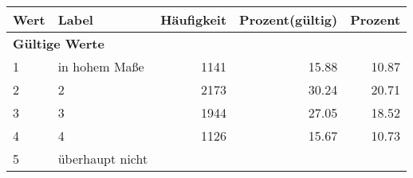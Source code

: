      \begin{longtable}{lXrrr}
     \toprule
     \textbf{Wert} & \textbf{Label} & \textbf{Häufigkeit} & \textbf{Prozent(gültig)} & \textbf{Prozent} \\
     \endhead
     \midrule
     \multicolumn{5}{l}{\textbf{Gültige Werte}}\\

     1 &
     \multicolumn{1}{X}{ in hohem Maße   } &


       \num{1141} &
       \num[round-mode=places,round-precision=2]{15.88} &
         \num[round-mode=places,round-precision=2]{10.87} \\

     2 &
     \multicolumn{1}{X}{ 2   } &


       \num{2173} &
       \num[round-mode=places,round-precision=2]{30.24} &
         \num[round-mode=places,round-precision=2]{20.71} \\

     3 &
     \multicolumn{1}{X}{ 3   } &


       \num{1944} &
       \num[round-mode=places,round-precision=2]{27.05} &
         \num[round-mode=places,round-precision=2]{18.52} \\

     4 &
     \multicolumn{1}{X}{ 4   } &


       \num{1126} &
       \num[round-mode=places,round-precision=2]{15.67} &
         \num[round-mode=places,round-precision=2]{10.73} \\

     5 &
     \multicolumn{1}{X}{ überhaupt nicht   } &



\end{longtable}
